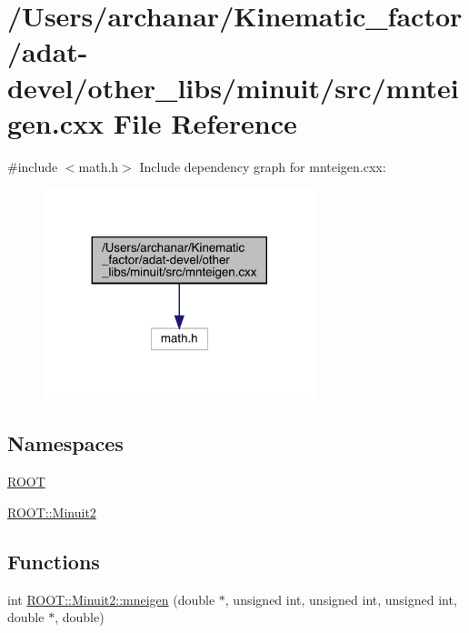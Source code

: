 \hypertarget{adat-devel_2other__libs_2minuit_2src_2mnteigen_8cxx}{}\section{/\+Users/archanar/\+Kinematic\+\_\+factor/adat-\/devel/other\+\_\+libs/minuit/src/mnteigen.cxx File Reference}
\label{adat-devel_2other__libs_2minuit_2src_2mnteigen_8cxx}
{\ttfamily \#include $<$math.\+h$>$}\newline
Include dependency graph for mnteigen.\+cxx\+:
\nopagebreak
\begin{figure}[H]
\begin{center}
\leavevmode
\includegraphics[width=224pt]{d5/d86/adat-devel_2other__libs_2minuit_2src_2mnteigen_8cxx__incl}
\end{center}
\end{figure}
\subsection*{Namespaces}
\begin{DoxyCompactItemize}
\item 
 \mbox{\hyperlink{namespaceROOT}{R\+O\+OT}}
\item 
 \mbox{\hyperlink{namespaceROOT_1_1Minuit2}{R\+O\+O\+T\+::\+Minuit2}}
\end{DoxyCompactItemize}
\subsection*{Functions}
\begin{DoxyCompactItemize}
\item 
int \mbox{\hyperlink{namespaceROOT_1_1Minuit2_a4a6b91c57b107c48f582569401bb12e9}{R\+O\+O\+T\+::\+Minuit2\+::mneigen}} (double $\ast$, unsigned int, unsigned int, unsigned int, double $\ast$, double)
\end{DoxyCompactItemize}
